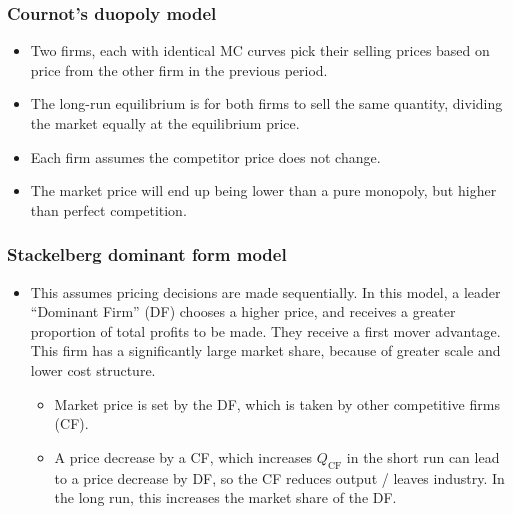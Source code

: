 \documentclass[../notes_compiled.tex]{subfiles}
\begin{document}
\subsubsection{Cournot's duopoly model}
\begin{itemize}
\item Two firms, each with identical MC curves pick their selling prices based on price from the other firm in the previous period. 
\item The long-run equilibrium is for both firms to sell the same quantity, dividing the market equally at the equilibrium price.
\item Each firm assumes the competitor price does not change.
\item The market price will end up being lower than a pure monopoly, but higher than perfect competition.
\end{itemize}

\subsubsection{Stackelberg dominant form model}
\begin{itemize}
\item This assumes pricing decisions are made sequentially. In this model, a leader ``Dominant Firm'' (DF) chooses a higher price, and receives a greater proportion of total profits to be made. They receive a first mover advantage. This firm has a significantly large market share, because of greater scale and lower cost structure.
\begin{itemize}
\item Market price is set by the DF, which is taken by other competitive firms (CF).
\item A price decrease by a CF, which increases $Q_{\text{CF}}$ in the short run can lead to a price decrease by DF, so the CF reduces output / leaves industry. In the long run, this increases the market share of the DF.
\end{itemize}
\end{itemize}
\end{document}
